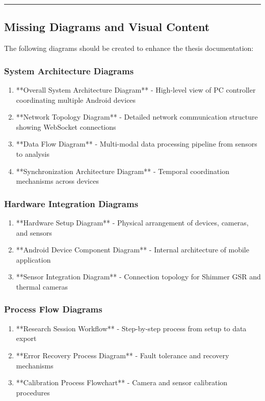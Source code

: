 \documentclass[12pt,a4paper]{report}
\begin{document}
\hrule

\subsection{Missing Diagrams and Visual Content}

The following diagrams should be created to enhance the thesis documentation:

\subsubsection{System Architecture Diagrams}

\begin{enumerate}
\item **Overall System Architecture Diagram** - High-level view of PC controller coordinating multiple Android devices
\item **Network Topology Diagram** - Detailed network communication structure showing WebSocket connections
\item **Data Flow Diagram** - Multi-modal data processing pipeline from sensors to analysis
\item **Synchronization Architecture Diagram** - Temporal coordination mechanisms across devices

\end{enumerate}
\subsubsection{Hardware Integration Diagrams}

\begin{enumerate}
\item **Hardware Setup Diagram** - Physical arrangement of devices, cameras, and sensors
\item **Android Device Component Diagram** - Internal architecture of mobile application
\item **Sensor Integration Diagram** - Connection topology for Shimmer GSR and thermal cameras

\end{enumerate}
\subsubsection{Process Flow Diagrams}

\begin{enumerate}
\item **Research Session Workflow** - Step-by-step process from setup to data export
\item **Error Recovery Process Diagram** - Fault tolerance and recovery mechanisms
\item **Calibration Process Flowchart** - Camera and sensor calibration procedures

\end{enumerate}
\end{document}
